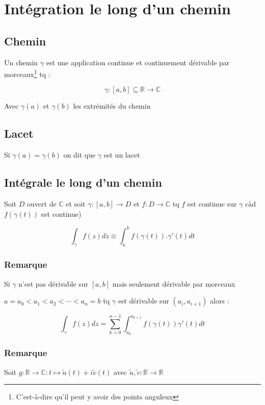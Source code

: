 \documentclass[a4paper,10pt]{report}
\newcommand{\ap}{\rightarrow}
\newcommand{\R}{\mathbb{R}}
\newcommand{\C}{\mathbb{C}}
\begin{document}
\section{Intégration le long d'un chemin}

\subsection{Chemin}

Un chemin $\gamma$ est une application continue et continuement dérivable par morceaux\footnote{C'est-à-dire qu'il peut y avoir des points anguleux} tq :

\[\gamma : [a,b]\subseteq \R \ap \C\]

Avec $\gamma(a)$ et $\gamma(b)$ les extrémités du chemin

\subsection{Lacet}

Si $\gamma(a) = \gamma(b)$ on dit que $\gamma$ est un lacet

\subsection{Intégrale le long d'un chemin}

Soit $D$ ouvert de $\C$ et soit $\gamma : [a,b] \ap D$ et $f : D \ap \C$ tq $f$ est continue sur $\gamma$ càd $f(\gamma(t))$ est continue)

\[\int_\gamma f(z) dz \equiv \int_a^b f(\gamma(t)).\gamma'(t) dt\]

\subsubsection{Remarque}

Si $\gamma$ n'est pas dérivable sur $[a,b]$ mais seulement dérivable par morceaux

$a = a_0 < a_1 < a_2 < \cdots < a_n = b$ tq $\gamma$ est dérivable sur $(a_i, a_{i+1})$ alors :

\[ \int_\gamma f(z) dz = \sum_{k=0}^{n-1} \int_{a_k}^{a_{k+1}} f(\gamma(t)) \gamma'(t) dt \]

\subsubsection{Remarque}

Soit $g : \R \ap \C : t \mapsto \tilde u (t) + i \tilde v(t)$ avec $\tilde u, \tilde v : \R \ap \R$
\end{document}
